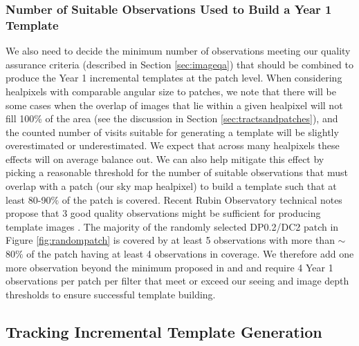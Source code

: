 \documentclass[preprintm,linenumbers]{aastex631}
\begin{document}
	\subsubsection{Number of Suitable Observations Used to Build a Year 1 Template}
	\label{sec:num_images}
	We also need to decide the minimum number of observations meeting our quality assurance criteria (described in Section \ref{sec:imageqa}) that should be combined to produce the Year 1 incremental templates at the patch level.  
 When considering healpixels with comparable angular size to patches, we note that there will be some cases when the overlap of images that lie within a given healpixel will not fill 100\% of the area (see the discussion in Section \ref{sec:tractsandpatches}), and the counted number of visits suitable for generating a template will be slightly overestimated or underestimated. 
 We expect that across many healpixels these effects will on average balance out. 
 We can also help mitigate this effect by picking a reasonable threshold for the number of suitable observations that must overlap with a patch (our sky map healpixel) to build a template such that at least 80-90$\%$ of the patch is covered. 
 Recent Rubin Observatory technical notes propose that 3 good quality observations might be sufficient for producing template images \citep{DMTN-107,RTN-011}. 
 The majority of the randomly selected DP0.2/DC2 patch in Figure \ref{fig:randompatch} is covered by at least 5 observations with more than $\sim$80$\%$ of the patch having at least 4 observations in coverage. 
 We therefore add one more observation beyond the minimum proposed in \cite{DMTN-107} and \cite{RTN-011} and require 4 Year 1 observations per patch per filter that meet or exceed our seeing and image depth thresholds to ensure successful template building.
		
		
		\subsection{Tracking Incremental Template Generation}
		\label{sec:tracking_incremental_template_generation}
		
\end{document}
